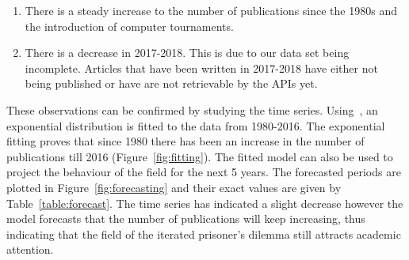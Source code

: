 \documentclass{article}
\theoremstyle{definition}
\begin{document}
\begin{enumerate}
    \item There is a steady increase to the number of publications since the 1980s
    and the introduction of computer tournaments.
    \item There is a decrease in 2017-2018. This is due to our data set being incomplete.
    Articles that have been written in 2017-2018 have either not being published
    or have are not retrievable by the APIs yet.
\end{enumerate}

These observations can be confirmed by studying the time series.
Using~\cite{scipy}, an exponential distribution is fitted to
the data from 1980-2016. The exponential fitting proves that since 1980 there has
been an increase in the number of publications till 2016 (Figure~\ref{fig:fitting}).
The fitted model can also be used to project the behaviour of the field for the next 
5 years. The forecasted periods are plotted in Figure~\ref{fig:forecasting} and
their exact values are given by Table~\ref{table:forecast}. The time series
has indicated a slight decrease however the model forecasts that the number
of publications will keep increasing, thus indicating that the field of the iterated
prisoner's dilemma still attracts academic attention.
\end{document}
